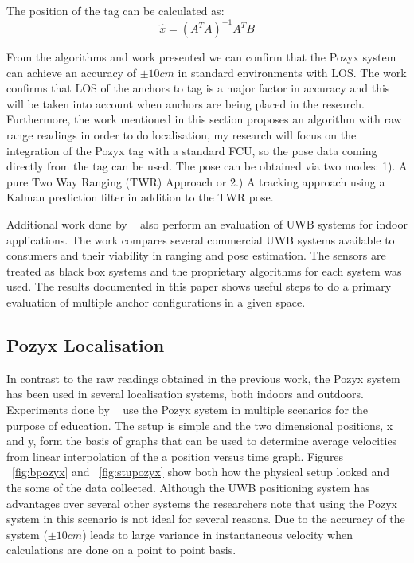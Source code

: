         The position of the tag can be calculated as:
        \[
            \hat{x} = (A^{T}A)^{-1}A^{T}B
        \]

From the algorithms and work presented we can confirm that the Pozyx system can achieve an accuracy of $\pm10cm$ in standard environments with LOS.
The work confirms that LOS of the anchors to tag is a major factor in accuracy and this will be taken into account when anchors are being placed in the research.
Furthermore, the work mentioned in this section proposes an algorithm with raw range readings in order to do localisation, my research will focus on the integration of the Pozyx tag with a standard FCU, so the pose data coming directly from the tag can be used.
The pose can be obtained via two modes: 1). A pure Two Way Ranging (TWR) Approach or 2.) A tracking approach using a Kalman prediction filter in addition to the TWR pose.

Additional work done by ~\citet{di2019evaluation} also perform an evaluation of UWB systems for indoor applications.
The work compares several commercial UWB systems available to consumers and their viability in ranging and pose estimation.
The sensors are treated as black box systems and the proprietary algorithms for each system was used.
The results documented in this paper shows useful steps to do a primary evaluation of multiple anchor configurations in a given space.

\subsection{Pozyx Localisation}\label{subsec:pozyx-localisation}
In contrast to the raw readings obtained in the previous work, the Pozyx system has been used in several localisation systems, both indoors and outdoors.
Experiments done by ~\citet{destefano2019using} use the Pozyx system in multiple scenarios for the purpose of education.
The setup is simple and the two dimensional positions, x and y, form the basis of  graphs that can be used to determine average velocities from linear interpolation of the a position versus time graph.
Figures ~\ref{fig:bpozyx} and ~\ref{fig:stupozyx} show both how the physical setup looked and the some of the data collected.
Although the UWB positioning system has advantages over several other systems the researchers note that using the Pozyx system in this scenario is not ideal for several reasons.
Due to the accuracy of the system ($\pm10cm$) leads to large variance in instantaneous velocity when calculations are done on a point to point basis.


